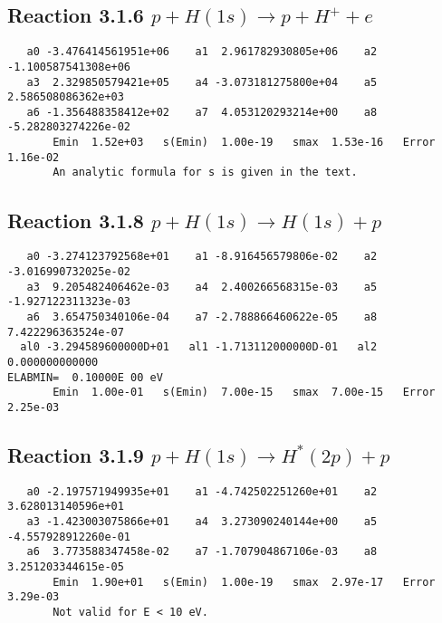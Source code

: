 \documentclass[12pt]{article}
\begin{document}
\newpage
\subsection{
Reaction 3.1.6 $   p + H(1s) \rightarrow p + H^+ + e$}


\begin{small}\begin{verbatim}
   a0 -3.476414561951e+06    a1  2.961782930805e+06    a2 -1.100587541308e+06
   a3  2.329850579421e+05    a4 -3.073181275800e+04    a5  2.586508086362e+03
   a6 -1.356488358412e+02    a7  4.053120293214e+00    a8 -5.282803274226e-02
       Emin  1.52e+03   s(Emin)  1.00e-19   smax  1.53e-16   Error  1.16e-02
       An analytic formula for s is given in the text.
\end{verbatim}\end{small}



                             


\newpage
\subsection{
Reaction 3.1.8 $   p + H(1s) \rightarrow H(1s) + p$}


\begin{small}\begin{verbatim}
   a0 -3.274123792568e+01    a1 -8.916456579806e-02    a2 -3.016990732025e-02
   a3  9.205482406462e-03    a4  2.400266568315e-03    a5 -1.927122311323e-03
   a6  3.654750340106e-04    a7 -2.788866460622e-05    a8  7.422296363524e-07
  al0 -3.294589600000D+01   al1 -1.713112000000D-01   al2  0.000000000000
ELABMIN=  0.10000E 00 eV
       Emin  1.00e-01   s(Emin)  7.00e-15   smax  7.00e-15   Error  2.25e-03
\end{verbatim}\end{small}

\newpage
\subsection{
Reaction 3.1.9 $   p + H(1s) \rightarrow H^*(2p) + p$}


\begin{small}\begin{verbatim}
   a0 -2.197571949935e+01    a1 -4.742502251260e+01    a2  3.628013140596e+01
   a3 -1.423003075866e+01    a4  3.273090240144e+00    a5 -4.557928912260e-01
   a6  3.773588347458e-02    a7 -1.707904867106e-03    a8  3.251203344615e-05
       Emin  1.90e+01   s(Emin)  1.00e-19   smax  2.97e-17   Error  3.29e-03
       Not valid for E < 10 eV.
\end{verbatim}\end{small}
\end{document}

